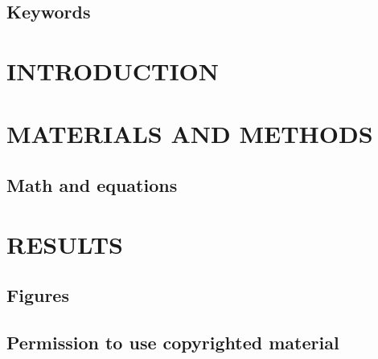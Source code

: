 \documentclass{asm-article}
\begin{document}
\maketitle

\begin{abstract}%

\begin{importance}%

\end{importance}
\end{abstract}

\subsection{Keywords}


\section{INTRODUCTION}


\section{MATERIALS AND METHODS}






\subsection{Math and equations}




\section{RESULTS}


\subsection{Figures}
%

\subsection{Permission to use copyrighted material}

\end{document}
